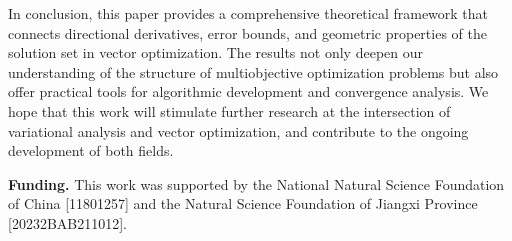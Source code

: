 \documentclass[11pt]{article}
\begin{document}
In conclusion, this paper provides a comprehensive theoretical framework that connects directional derivatives, error bounds, and geometric properties of the solution set in vector optimization. The results not only deepen our understanding of the structure of multiobjective optimization problems but also offer practical tools for algorithmic development and convergence analysis. We hope that this work will stimulate further research at the intersection of variational analysis and vector optimization, and contribute to the ongoing development of both fields.






\bigskip
\noindent
{\bf Funding.} This work was supported by the National Natural Science Foundation of China [11801257] and the Natural Science Foundation of Jiangxi Province [20232BAB211012].
\end{document}
